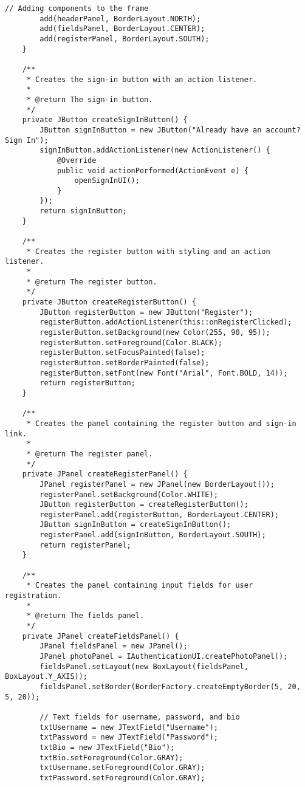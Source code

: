 \begin{lstlisting}[style=JavaStyle, caption={SignUpUI Class}, label={lst:SignUpUI-codesnippet}]
        // Adding components to the frame
        add(headerPanel, BorderLayout.NORTH);
        add(fieldsPanel, BorderLayout.CENTER);
        add(registerPanel, BorderLayout.SOUTH);
    }

    /**
     * Creates the sign-in button with an action listener.
     *
     * @return The sign-in button.
     */
    private JButton createSignInButton() {
        JButton signInButton = new JButton("Already have an account? Sign In");
        signInButton.addActionListener(new ActionListener() {
            @Override
            public void actionPerformed(ActionEvent e) {
                openSignInUI();
            }
        });
        return signInButton;
    }

    /**
     * Creates the register button with styling and an action listener.
     *
     * @return The register button.
     */
    private JButton createRegisterButton() {
        JButton registerButton = new JButton("Register");
        registerButton.addActionListener(this::onRegisterClicked);
        registerButton.setBackground(new Color(255, 90, 95));
        registerButton.setForeground(Color.BLACK);
        registerButton.setFocusPainted(false);
        registerButton.setBorderPainted(false);
        registerButton.setFont(new Font("Arial", Font.BOLD, 14));
        return registerButton;
    }

    /**
     * Creates the panel containing the register button and sign-in link.
     *
     * @return The register panel.
     */
    private JPanel createRegisterPanel() {
        JPanel registerPanel = new JPanel(new BorderLayout());
        registerPanel.setBackground(Color.WHITE);
        JButton registerButton = createRegisterButton();
        registerPanel.add(registerButton, BorderLayout.CENTER);
        JButton signInButton = createSignInButton();
        registerPanel.add(signInButton, BorderLayout.SOUTH);
        return registerPanel;
    }

    /**
     * Creates the panel containing input fields for user registration.
     *
     * @return The fields panel.
     */
    private JPanel createFieldsPanel() {
        JPanel fieldsPanel = new JPanel();
        JPanel photoPanel = IAuthenticationUI.createPhotoPanel();
        fieldsPanel.setLayout(new BoxLayout(fieldsPanel, BoxLayout.Y_AXIS));
        fieldsPanel.setBorder(BorderFactory.createEmptyBorder(5, 20, 5, 20));

        // Text fields for username, password, and bio
        txtUsername = new JTextField("Username");
        txtPassword = new JTextField("Password");
        txtBio = new JTextField("Bio");
        txtBio.setForeground(Color.GRAY);
        txtUsername.setForeground(Color.GRAY);
        txtPassword.setForeground(Color.GRAY);


\end{lstlisting}
